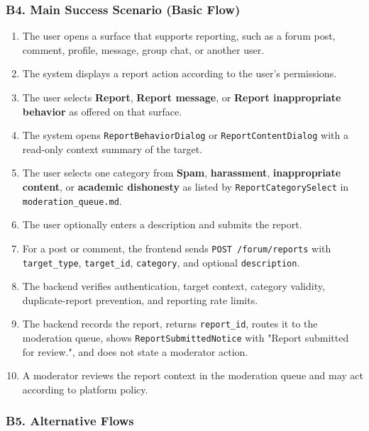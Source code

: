 \documentclass[12pt]{article}
\begin{document}
\hypertarget{sec:b4-main-success-scenario-basic-flow}{}
\subsubsection*{B4. Main Success Scenario (Basic Flow)}
\par\medskip

\begin{enumerate}
\item The user opens a surface that supports reporting, such as a forum post, comment, profile, message, group chat, or another user.
\item The system displays a report action according to the user's permissions.
\item The user selects \textbf{Report}, \textbf{Report message}, or \textbf{Report inappropriate behavior} as offered on that surface.
\item The system opens \texttt{ReportBehaviorDialog} or \texttt{ReportContentDialog} with a read-only context summary of the target.
\item The user selects one category from \textbf{Spam}, \textbf{harassment}, \textbf{inappropriate content}, or \textbf{academic dishonesty} as listed by \texttt{ReportCategorySelect} in \texttt{moderation\_queue.md}.
\item The user optionally enters a description and submits the report.
\item For a post or comment, the frontend sends \texttt{POST /forum/reports} with \texttt{target\_type}, \texttt{target\_id}, \texttt{category}, and optional \texttt{description}.
\item The backend verifies authentication, target context, category validity, duplicate-report prevention, and reporting rate limits.
\item The backend records the report, returns \texttt{report\_id}, routes it to the moderation queue, shows \texttt{ReportSubmittedNotice} with "Report submitted for review.", and does not state a moderator action.
\item A moderator reviews the report context in the moderation queue and may act according to platform policy.
\end{enumerate}
\par\medskip

\hypertarget{sec:b5-alternative-flows}{}
\subsubsection*{B5. Alternative Flows}
\par\medskip
\end{document}
